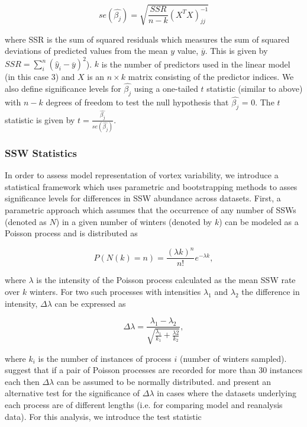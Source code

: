 \begin{equation} \label{regression}
se(\hat{\beta_j}) = \sqrt{\frac{SSR}{n - k} (X^TX)^{-1}_{jj}}
\end{equation}

where SSR is the sum of squared residuals which measures the sum of squared deviations of predicted values from the mean $y$ value, $\overline{y}$. This is given by $SSR = \sum_i^n{(\hat{y}_i - \overline{y})^2}$). $k$ is the number of predictors used in the linear model (in this case 3) and $X$ is an $n \times k$ matrix consisting of the predictor indices. We also define significance levels for $\hat{\beta_j}$ using a one-tailed $t$ statistic (similar to above) with $n-k$ degrees of freedom to test the null hypothesis that $\hat{\beta_j}$ = 0. The $t$ statistic is given by $t = \frac{\hat{\beta_j}}{se(\hat{\beta_j})}$.

\subsubsection*{SSW Statistics}
In order to assess model representation of vortex variability, we introduce a statistical framework which uses parametric and bootstrapping methods to asses significance levels for differences in SSW abundance across datasets. First, a parametric approach which assumes that the occurrence of any number of SSWs (denoted as $N$) in a given number of winters (denoted by $k$) can be modeled as a Poisson process and is distributed as 

\begin{equation} \label{Poisson}
P(N(k) = n) = \frac{(\lambda k)^n}{n!} e^{-\lambda k},
\end{equation}

where $\lambda$ is the intensity of the Poisson process calculated as the mean SSW rate over $k$ winters. For two such processes with intensities $\lambda_1$ and $\lambda_2$ the difference in intensity, $\Delta\lambda$ can be expressed as

\begin{equation} \label{Poisson}
\Delta\lambda = \frac{\lambda_1 - \lambda_2}{\sqrt{\frac{\lambda_1}{k_1} + \frac{\lambda2}{k_2}}},
\end{equation}

where $k_i$ is the number of instances of process $i$ (number of winters sampled). \cite{Charlton2007} suggest that if a pair of Poisson processes are recorded for more than 30 instances each then $\Delta\lambda$ can be assumed to be normally distributed. \cite{Gu} and \cite{Huffman} present an alternative test for the significance of $\Delta\lambda$ in cases where the datasets underlying each process are of different lengths (i.e. for comparing model and reanalysis data). For this analysis, we introduce the test statistic

